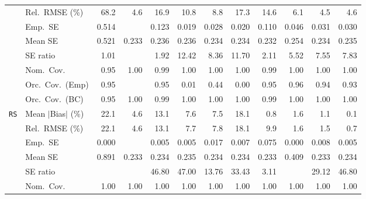 \begin{landscape}
\begin{longtable}{llrrrrrrrrrr}
 & Rel.\ RMSE (\%) & 68.2 & \cellcolor{ranktwo}4.6 & 16.9 & 10.8 & 8.8 & 17.3 & 14.6 & \cellcolor{rankthree}6.1 & \cellcolor{rankone}4.5 & \cellcolor{ranktwo}4.6 \\
 & Emp.\ SE & 0.514 &  & 0.123 & 0.019 & 0.028 & 0.020 & 0.110 & 0.046 & 0.031 & 0.030 \\
 & Mean SE & 0.521 & 0.233 & 0.236 & 0.236 & 0.234 & 0.234 & 0.232 & 0.254 & 0.234 & 0.235 \\
 & SE ratio & \cellcolor{rankone}1.01 &  & \cellcolor{ranktwo}1.92 & 12.42 & 8.36 & 11.70 & \cellcolor{rankthree}2.11 & 5.52 & 7.55 & 7.83 \\
 & Nom.\ Cov. & \cellcolor{rankone}0.95 & \cellcolor{rankthree}1.00 & \cellcolor{ranktwo}0.99 & \cellcolor{rankthree}1.00 & \cellcolor{rankthree}1.00 & \cellcolor{rankthree}1.00 & \cellcolor{ranktwo}0.99 & \cellcolor{rankthree}1.00 & \cellcolor{rankthree}1.00 & \cellcolor{rankthree}1.00 \\
 & Orc.\ Cov.\ (Emp) & \cellcolor{rankone}0.95 &  & \cellcolor{rankone}0.95 & 0.01 & 0.44 & 0.00 & \cellcolor{rankone}0.95 & \cellcolor{ranktwo}0.96 & \cellcolor{ranktwo}0.94 & \cellcolor{rankthree}0.93 \\
 & Orc.\ Cov.\ (BC) & \cellcolor{rankone}0.95 & \cellcolor{rankthree}1.00 & \cellcolor{ranktwo}0.99 & \cellcolor{rankthree}1.00 & \cellcolor{rankthree}1.00 & \cellcolor{rankthree}1.00 & \cellcolor{ranktwo}0.99 & \cellcolor{rankthree}1.00 & \cellcolor{rankthree}1.00 & \cellcolor{rankthree}1.00 \\
\addlinespace[2pt]
\quad \texttt{RS} & Mean $|$Bias$|$ (\%) & 22.1 & 4.6 & 13.1 & 7.6 & 7.5 & 18.1 & \cellcolor{ranktwo}0.8 & 1.6 & \cellcolor{rankthree}1.1 & \cellcolor{rankone}0.1 \\
 & Rel.\ RMSE (\%) & 22.1 & 4.6 & 13.1 & 7.7 & 7.8 & 18.1 & 9.9 & \cellcolor{rankthree}1.6 & \cellcolor{ranktwo}1.5 & \cellcolor{rankone}0.7 \\
 & Emp.\ SE & 0.000 &  & 0.005 & 0.005 & 0.017 & 0.007 & 0.075 & 0.000 & 0.008 & 0.005 \\
 & Mean SE & 0.891 & 0.233 & 0.234 & 0.235 & 0.234 & 0.234 & 0.233 & 0.409 & 0.233 & 0.234 \\
 & SE ratio &  &  & 46.80 & 47.00 & \cellcolor{ranktwo}13.76 & 33.43 & \cellcolor{rankone}3.11 &  & \cellcolor{rankthree}29.12 & 46.80 \\
 & Nom.\ Cov. & \cellcolor{rankone}1.00 & \cellcolor{rankone}1.00 & \cellcolor{rankone}1.00 & \cellcolor{rankone}1.00 & \cellcolor{rankone}1.00 & \cellcolor{rankone}1.00 & \cellcolor{rankone}1.00 & \cellcolor{rankone}1.00 & \cellcolor{rankone}1.00 & \cellcolor{rankone}1.00 \\

\end{longtable}
\end{landscape}
